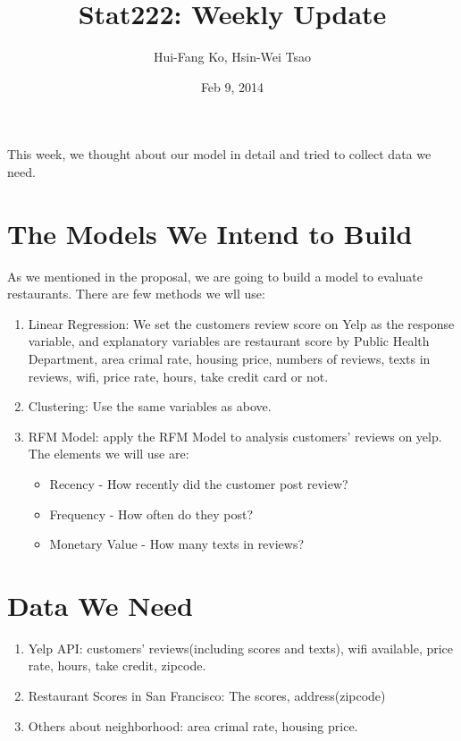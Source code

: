 \documentclass{article}
\title{Stat222: Weekly Update}
\author{Hui-Fang Ko, Hsin-Wei Tsao}
\date{Feb 9, 2014}
\begin{document}
\maketitle
This week, we thought about our model in detail and tried to collect data we need.
\section*{The Models We Intend to Build}
As we mentioned in the proposal, we are going to build a model to evaluate restaurants. There are few methods we wll use:
\begin{enumerate}
\item Linear Regression: We set the customers review score on Yelp as the response variable, and explanatory variables are restaurant score by Public Health Department, area crimal rate, housing price, numbers of reviews, texts in reviews, wifi, price rate, hours, take credit card or not.
\item Clustering: Use the same variables as above. 
\item RFM Model: apply the RFM Model to analysis customers' reviews on yelp. The elements we will use are: 
\begin{itemize}
\item Recency - How recently did the customer post review?
\item Frequency - How often do they post?
\item Monetary Value - How many texts in reviews?
\end{itemize}

\end{enumerate}


\section*{Data We Need}
\begin{enumerate}
\item Yelp API: customers' reviews(including scores and texts), wifi available, price rate, hours, take credit, zipcode. 
\item Restaurant Scores in San Francisco: The scores, address(zipcode)
\item Others about neighborhood: area crimal rate, housing price.
\end{enumerate}
\end{document}
